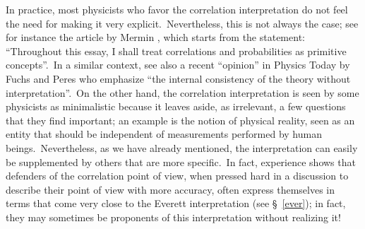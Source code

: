 \documentclass[12pt,onecolumn]{article}%
\begin{document}
In practice, most physicists who favor the correlation interpretation do not
feel the need for making it very explicit.\ Nevertheless, this is not always
the case; see for instance the article by Mermin \cite{Mermin-corr}, which
starts from the statement: ``Throughout this essay, I shall treat correlations
and probabilities as primitive concepts''.\ In a similar context, see also a
recent ``opinion'' in Physics Today by Fuchs and Peres \cite{Fuchs-Peres} who
emphasize ``the internal consistency of the theory without
interpretation''.\ On the other hand, the correlation interpretation is seen
by some physicists as minimalistic because it leaves aside, as irrelevant, a
few questions that they find important; an example is the notion of physical
reality, seen as an entity that should be independent of measurements
performed by human beings.\ Nevertheless, as we have already mentioned, the
interpretation can easily be supplemented by others that are more
specific.\ In fact, experience shows that defenders of the correlation point
of view, when pressed hard in a discussion to describe their point of view
with more accuracy, often express themselves in terms that come very close to
the Everett interpretation (see \S \ \ref{ever}); in fact, they may sometimes
be proponents of this interpretation without realizing it!
\end{document}
